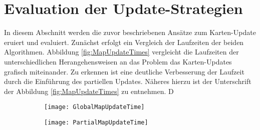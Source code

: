 \section{Evaluation der Update-Strategien}
\label{section:}

In diesem Abschnitt werden die zuvor beschriebenen Ansätze zum Karten-Update eruiert und evaluiert. Zunächst erfolgt ein Vergleich der Laufzeiten der beiden Algorithmen. Abbildung \ref{fig:MapUpdateTimes} vergleicht die Laufzeiten der unterschiedlichen Herangehensweisen an das Problem das Karten-Updates grafisch miteinander. Zu erkennen ist eine deutliche Verbesserung der Laufzeit durch die Einführung des partiellen Updates. Näheres hierzu ist der Unterschrift der Abbildung \ref{fig:MapUpdateTimes} zu entnehmen. D

\begin{figure}
	\centering
	\begin{subfigure}{.5\textwidth}
		 \centering
  		 \texttt{[image: GlobalMapUpdateTime]}
  		 \centering \caption{}
  		 \label{fig:GlobalMapUpdateTime}
	\end{subfigure}%
	\begin{subfigure}{.5\textwidth}
    	\centering
  		\texttt{[image: PartialMapUpdateTime]}
  		\centering \caption{}
  		\label{fig:PartialMapUpdateTime}
	\end{subfigure}

\end{figure}
